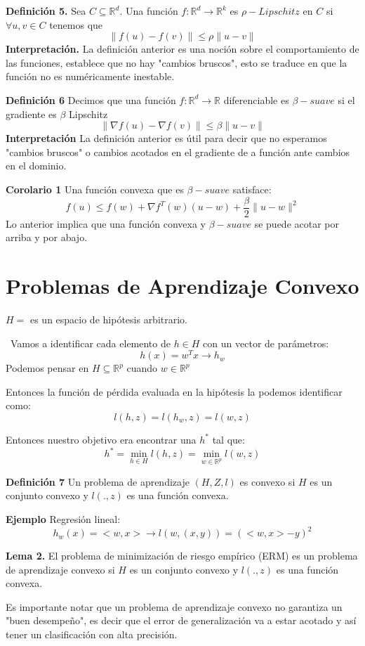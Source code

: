 \documentclass{article}
\providecommand{\norm}[1]{\lVert#1\rVert}
\begin{document}
\textbf{Definición 5.} Sea $C\subseteq\mathbb{R}^{d}$. Una función $f:\mathbb{R}^{d}\rightarrow\mathbb{R}^{k}$ es $\rho-Lipschitz$ en $C$ si $\forall u,v \in C$ tenemos que $$\norm{f(u)-f(v)}\leq \rho \norm{u-v}$$
\textbf{Interpretación.} La definición anterior es una noción sobre el comportamiento de las funciones, establece que no hay "cambios bruscos", esto se traduce en que la función no es numéricamente inestable.

\textbf{Definición 6} Decimos que una función $f:\mathbb{R}^{d}\rightarrow\mathbb{R}$ diferenciable es $\beta-suave$ si el gradiente es $\beta$ Lipschitz
$$\norm{\nabla f(u)-\nabla f(v)}\leq\beta\norm{u-v}$$
\textbf{Interpretación} La definición anterior es útil para decir que no esperamos "cambios bruscos" o cambios acotados en el gradiente de a función ante cambios en el dominio.

\textbf{Corolario 1} Una función convexa que es $\beta-suave$ satisface:
$$f(u)\leq f(w)+\nabla f^{T}(w)(u-w)+\frac{\beta}{2}\norm{u-w}^{2}$$
Lo anterior implica que una función convexa y $\beta-suave$ se puede acotar por arriba y por abajo.

\section{Problemas de Aprendizaje Convexo}
$H=$ es un espacio de hipótesis arbitrario.

\ Vamos a identificar cada elemento de $h\in H $ con un vector de parámetros:
$$h(x)=w^{T}x \rightarrow h_{w}$$
Podemos pensar en $H\subseteq \mathbb{R}^{p}$ cuando $w\in \mathbb{R}^{p}$

Entonces la función de pérdida evaluada en la hipótesis la podemos identificar como:
$$l(h,z)=l(h_{w},z)=l(w,z)$$

Entonces nuestro objetivo era encontrar una $h^{*}$ tal que:
$$h^{*}=\min\limits_{h \in H} l(h,z)=\min\limits_{w \in \mathbb{R}^{p} } l(w,z)$$


\textbf{Definición 7} Un problema de aprendizaje $(H,Z,l)$ es convexo si $H$ es un conjunto convexo y $l(.,z)$ es una función convexa.

\textbf{Ejemplo} Regresión lineal:
$$h_{w}(x)=<w,x> \rightarrow l(w,(x,y))=(<w,x>-y)^{2}$$

\textbf{Lema 2.} El problema de minimización de riesgo empírico (ERM) es un problema de aprendizaje convexo si $H$ es un conjunto convexo y $l(.,z)$ es una función convexa.\

Es importante notar que un problema de aprendizaje convexo no garantiza un "buen desempeño", es decir que el error de generalización va a estar acotado y así tener un clasificación con alta precisión. 
\end{document}

